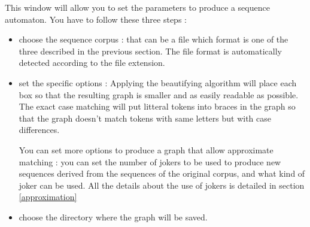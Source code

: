 This window will allow you to set the parameters to produce a sequence automaton.
You have to follow these three steps :
\begin{itemize}
\item choose the sequence corpus : that can be a file which format is one of the three described in the previous section. The file format
is automatically detected according to the file extension. 


\item set the specific options :
Applying the beautifying algorithm will place each box so that the resulting graph is smaller and as easily readable as possible.
The exact case matching will put litteral tokens into braces in the graph so that the graph doesn't match tokens with same letters but with case differences.

You can set more options to produce a graph that allow approximate matching :
you can set the number of jokers to be used to produce new sequences derived from the sequences of the original corpus, and what kind of joker can be used.
All the details about the use of jokers is detailed in section \ref{approximation}

\item choose the directory where the graph will be saved.
\end{itemize}
\medskip

